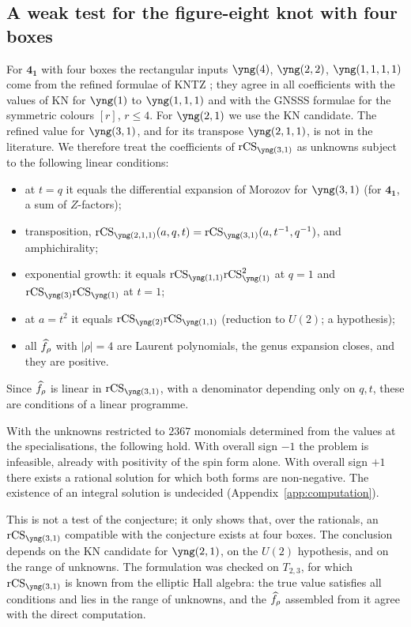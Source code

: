 \subsection{A weak test for the figure-eight knot with four boxes}\label{sec:fig8-four}
For $\mathbf{4_1}$ with four boxes the rectangular inputs $\yng(4)$, $\yng(2,2)$, $\yng(1,1,1,1)$ come from the refined formulae of KNTZ \cite{Kameyama19};
they agree in all coefficients with the values of KN for $\yng(1)$ to $\yng(1,1,1)$ and with the GNSSS formulae for the symmetric colours $[r]$, $r\le4$.
For $\yng(2,1)$ we use the KN candidate.
The refined value for $\yng(3,1)$, and for its transpose $\yng(2,1,1)$, is not in the literature.
We therefore treat the coefficients of $\rCS_{\yng(3,1)}$ as unknowns subject to the following linear conditions:
\begin{itemize} %
\item at $t=q$ it equals the differential expansion of Morozov \cite{Morozov16} for $\yng(3,1)$ (for $\mathbf{4_1}$, a sum of $Z$-factors);
\item transposition, $\rCS_{\yng(2,1,1)}(a,q,t)=\rCS_{\yng(3,1)}(a,t^{-1},q^{-1})$, and amphichirality;
\item exponential growth: it equals $\rCS_{\yng(1,1)}\rCS_{\yng(1)}^2$ at $q=1$ and $\rCS_{\yng(3)}\rCS_{\yng(1)}$ at $t=1$;
\item at $a=t^2$ it equals $\rCS_{\yng(2)}\rCS_{\yng(1,1)}$ (reduction to $U(2)$; a hypothesis);
\item all $\widehat{f}_\rho$ with $|\rho|=4$ are Laurent polynomials, the genus expansion closes, and they are positive.
\end{itemize}
Since $\widehat{f}_\rho$ is linear in $\rCS_{\yng(3,1)}$, with a denominator depending only on $q,t$, these are conditions of a linear programme.
\begin{compresult}\label{cr:fig8-four}
With the unknowns restricted to $2367$ monomials determined from the values at the specialisations, the following hold.
With overall sign $-1$ the problem is infeasible, already with positivity of the spin form alone.
With overall sign $+1$ there exists a rational solution for which both forms are non-negative.
The existence of an integral solution is undecided (Appendix~\ref{app:computation}).
\end{compresult}
This is not a test of the conjecture; it only shows that, over the rationals, an $\rCS_{\yng(3,1)}$ compatible with the conjecture exists at four boxes.
The conclusion depends on the KN candidate for $\yng(2,1)$, on the $U(2)$ hypothesis, and on the range of unknowns.
The formulation was checked on $T_{2,3}$, for which $\rCS_{\yng(3,1)}$ is known from the elliptic Hall algebra:
the true value satisfies all conditions and lies in the range of unknowns, and the $\widehat{f}_\rho$ assembled from it agree with the direct computation.


